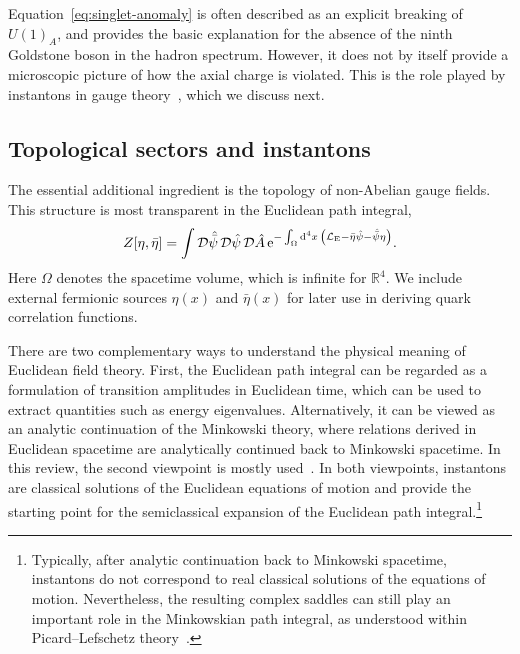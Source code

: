 \documentclass[review]{elsarticle}
\numberwithin{equation}{section}
\numberwithin{table}{section}
\numberwithin{figure}{section}
\begin{document}
Equation~\eqref{eq:singlet-anomaly} is often described as an explicit breaking of $U(1)_A$, and provides the basic explanation for the absence of the ninth Goldstone boson in the hadron spectrum. However, it does not by itself provide a microscopic picture of how the axial charge is violated. This is the role played by instantons in gauge theory~\cite{tHooft:1976snw,tHooft:1976rip}, which we discuss next. 


\subsection{Topological sectors and instantons}

The essential additional ingredient is the topology of non-Abelian gauge fields. This structure is most transparent in the Euclidean path integral,
\begin{align}
    Z[\eta,\bar \eta] = \int{\cal D}\hat{\bar\psi}\,{\cal D}\hat{\psi}\,{\cal D}\hat{A}\, {\rm e}^{-\int_\Omega {\rm d}^4x\,\left({\cal L}_{\rm E}-\bar \eta\hat{\psi}-\hat{\bar\psi} \eta\right)}.
    \label{partition:function}
\end{align}
Here $\Omega$ denotes the spacetime volume, which is infinite for $\mathbb{R}^4$. We include external fermionic sources $\eta(x)$ and $\bar\eta(x)$ for later use in deriving quark correlation functions.

There are two complementary ways to understand the physical meaning of Euclidean field theory. First, the Euclidean path integral can be regarded as a formulation of transition amplitudes in Euclidean time, which can be used to extract quantities such as energy eigenvalues. Alternatively, it can be viewed as an analytic continuation of the Minkowski theory, where relations derived in Euclidean spacetime are analytically continued back to Minkowski spacetime. In this review, the second viewpoint is mostly used~\cite{tHooft:1976rip}. In both viewpoints, instantons are classical solutions of the Euclidean equations of motion and provide the starting point for the semiclassical expansion of the Euclidean path integral.\footnote{Typically, after analytic continuation back to Minkowski spacetime, instantons do not correspond to real classical solutions of the equations of motion. Nevertheless, the resulting complex saddles can still play an important role in the Minkowskian path integral, as understood within Picard--Lefschetz theory~\cite{Cherman:2014sba,Ai:2019fri}.}
\end{document}
